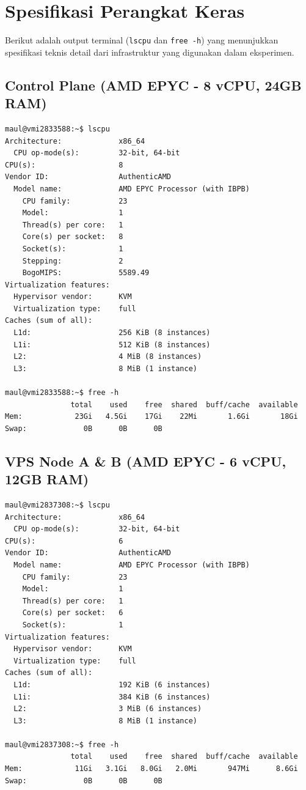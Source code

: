 \clearpage
\section{Spesifikasi Perangkat Keras}

Berikut adalah output terminal (\texttt{lscpu} dan \texttt{free -h}) yang menunjukkan spesifikasi teknis detail dari infrastruktur yang digunakan dalam eksperimen.

\subsection{Control Plane (AMD EPYC - 8 vCPU, 24GB RAM)}
\begin{lstlisting}[basicstyle=\footnotesize, breaklines=true, numbers=none]
maul@vmi2833588:~$ lscpu
Architecture:             x86_64
  CPU op-mode(s):         32-bit, 64-bit
CPU(s):                   8
Vendor ID:                AuthenticAMD
  Model name:             AMD EPYC Processor (with IBPB)
    CPU family:           23
    Model:                1
    Thread(s) per core:   1
    Core(s) per socket:   8
    Socket(s):            1
    Stepping:             2
    BogoMIPS:             5589.49
Virtualization features:  
  Hypervisor vendor:      KVM
  Virtualization type:    full
Caches (sum of all):      
  L1d:                    256 KiB (8 instances)
  L1i:                    512 KiB (8 instances)
  L2:                     4 MiB (8 instances)
  L3:                     8 MiB (1 instance)

maul@vmi2833588:~$ free -h
               total    used    free  shared  buff/cache  available
Mem:            23Gi   4.5Gi    17Gi    22Mi       1.6Gi       18Gi
Swap:             0B      0B      0B
\end{lstlisting}
\vspace{1cm}

\subsection{VPS Node A \& B (AMD EPYC - 6 vCPU, 12GB RAM)}
\begin{lstlisting}[basicstyle=\footnotesize, breaklines=true, numbers=none]
maul@vmi2837308:~$ lscpu
Architecture:             x86_64
  CPU op-mode(s):         32-bit, 64-bit
CPU(s):                   6
Vendor ID:                AuthenticAMD
  Model name:             AMD EPYC Processor (with IBPB)
    CPU family:           23
    Model:                1
    Thread(s) per core:   1
    Core(s) per socket:   6
    Socket(s):            1
Virtualization features:  
  Hypervisor vendor:      KVM
  Virtualization type:    full
Caches (sum of all):      
  L1d:                    192 KiB (6 instances)
  L1i:                    384 KiB (6 instances)
  L2:                     3 MiB (6 instances)
  L3:                     8 MiB (1 instance)

maul@vmi2837308:~$ free -h
               total    used    free  shared  buff/cache  available
Mem:            11Gi   3.1Gi   8.0Gi   2.0Mi       947Mi      8.6Gi
Swap:             0B      0B      0B
\end{lstlisting}
\vspace{1cm}


